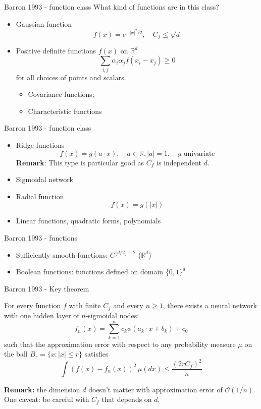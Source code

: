 \documentclass[aspectratio=169]{beamer} %
\begin{document}
\begin{frame}{Barron 1993 - function class}
What kind of functions are in this class?
\begin{itemize}
    \item Gaussian function
    $$
    f(x) = e^{-|x|^2/2},\quad C_f\le \sqrt{d}
    $$
    \item Positive definite functions $f(x)$ on $\mathbb{R}^d$
    $$
    \sum_{i,j} \alpha_i\alpha_j f(x_i-x_j)\ge 0
    $$
    for all choices of points and scalars.
    \begin{itemize}
        \item Covariance functions; 
        \item Characteristic functions
    \end{itemize}
    
\end{itemize}
\end{frame}
\begin{frame}{Barron 1993 - function class}
\begin{itemize}
    \item Ridge functions
    $$
    f(x) = g(a\cdot x),\quad a\in\mathbb{R}, |a|=1, \quad g\text{ univariate}
    $$
    \textbf{Remark}: This type is particular good as $C_f$ is independent $d$.
    \item Sigmoidal network
    \item Radial function
    $$
    f(x) = g(|x|)
    $$
    \item Linear functions, quadratic forms, polynomials
\end{itemize}
\end{frame}
\begin{frame}{Barron 1993 - functions}
\begin{itemize}
    \item Sufficiently smooth functions: $C^{\lfloor d/2\rfloor+2}$ ($\mathbb{R}^d$)
    \item Boolean functions: functions defined on domain $\{0,1\}^d$
\end{itemize}
    
\end{frame}
\begin{frame}{Barron 1993 - Key theorem}
\begin{theorem}
    For every function $f$ with finite $C_f$ and every $n\ge 1$, there exists a neural network with one hidden layer of $n$-sigmoidal nodes:
    $$
    f_n(x) = \sum_{k=1}^n c_k\phi(a_k \cdot x + b_k)+c_0
    $$
    such that the approximation error with respect to any probability measure $\mu$ on the ball $B_r = \{x: |x|\le r\}$ satisfies
    $$
    \int (f(x)-f_n(x))^2 \, \mu(dx) \le \frac{(2rC_f)^2}{n}
    $$
\end{theorem}
\textbf{Remark:} the dimension $d$ doesn't matter with  approximation error of $\mathcal{O}(1/n)$. One caveat: be careful with $C_f$ that depends on $d$.
    
\end{frame}
\end{document}
